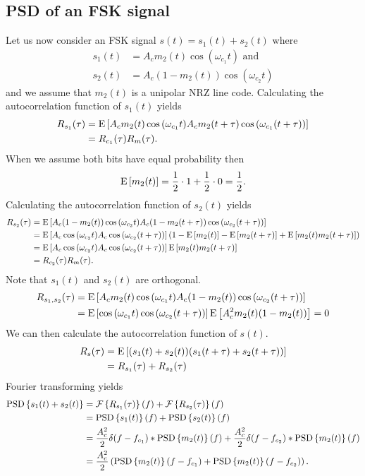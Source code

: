 \documentclass[11pt,titlepage]{report}
\begin{document}
\begin{appendices}
\subsection{PSD of an FSK signal}
Let us now consider an FSK signal $s(t)=s_1(t)+s_2(t)$ where
\begin{align*}
	s_1(t) &= A_c m_2(t) \cos{(\omega_{c_1} t)} \text{ and } \\
	s_2(t) &= A_c (1-m_2(t)) \cos{(\omega_{c_2} t)}
\end{align*}
and we assume that $m_2(t)$ is a unipolar NRZ line code. Calculating the autocorrelation function of $s_1(t)$ yields
\begin{align*}
	R_{s_1}(\tau) &= \operatorname{E}\left[A_c m_2(t) \cos{(\omega_{c_1} t)} A_c m_2(t+\tau) \cos{(\omega_{c_1} (t+\tau))}\right] \\
	&= R_{c_1}(\tau) R_{m}(\tau).
\end{align*}
When we assume both bits have equal probability then
\begin{align*}
	\operatorname{E}\left[m_2(t)\right] = \frac{1}{2} \cdot 1 + \frac{1}{2} \cdot 0 = \frac{1}{2}.
\end{align*}
Calculating the autocorrelation function of $s_2(t)$ yields
\begin{align*}
	R_{s_2}(\tau) &= \operatorname{E}\left[A_c (1-m_2(t)) \cos{(\omega_{c_2} t)} A_c (1-m_2(t+\tau)) \cos{(\omega_{c_2} (t+\tau))}\right] \\
	&= \operatorname{E}\left[A_c\cos{(\omega_{c_2} t)} A_c \cos{(\omega_{c_2} (t+\tau))}\right]\left( 1 - \operatorname{E}\left[m_2(t)\right] - \operatorname{E}\left[m_2(t+\tau)\right] + \operatorname{E}\left[m_2(t)m_2(t+\tau)\right] \right) \\
	&= \operatorname{E}\left[A_c\cos{(\omega_{c_2} t)} A_c \cos{(\omega_{c_2} (t+\tau))}\right] \operatorname{E}\left[m_2(t)m_2(t+\tau)\right] \\
	&= R_{c_2}(\tau) R_{m}(\tau).
\end{align*}
Note that $s_1(t)$ and $s_2(t)$ are orthogonal.
\begin{align*}
	R_{s_1,s_2}(\tau)&=\operatorname{E}\left[A_c m_2(t) \cos{(\omega_{c_1} t)} A_c (1-m_2(t)) \cos{(\omega_{c_2} (t+\tau))}\right] \\
	&= \operatorname{E}\left[\cos{(\omega_{c_1} t)}\cos{(\omega_{c_2} (t+\tau))}\right] \operatorname{E}\left[A_c^2 m_2(t) (1-m_2(t))\right] = 0
\end{align*}
We can then calculate the autocorrelation function of $s(t)$.
\begin{align*}
	R_s(\tau)&=\operatorname{E}\left[(s_1(t)+s_2(t))(s_1(t+\tau)+s_2(t+\tau))\right] \\
	&=R_{s_1}(\tau)+R_{s_2}(\tau)
\end{align*}
Fourier transforming yields
\begin{align}
	\operatorname{PSD}\left\{s_1(t)+s_2(t)\right\} &= \mathcal{F}\left\{R_{s_1}(\tau)\right\}(f) + \mathcal{F}\left\{R_{s_2}(\tau)\right\}(f) \nonumber \\
	&= \operatorname{PSD}\left\{s_1(t)\right\}(f) + \operatorname{PSD}\left\{s_2(t)\right\}(f) \nonumber \\
	&= \frac{A_c^2}{2} \delta(f-f_{c_1}) \ast \operatorname{PSD}\left\{m_2(t)\right\}(f) + \frac{A_c^2}{2} \delta(f-f_{c_2}) \ast \operatorname{PSD}\left\{m_2(t)\right\}(f) \nonumber \\
	&= \frac{A_c^2}{2}\left( \operatorname{PSD}\left\{m_2(t)\right\}(f-f_{c_1}) + \operatorname{PSD}\left\{m_2(t)\right\}(f-f_{c_2}) \right). \label{eq:psd-fsk}
\end{align}

\end{appendices}
\end{document}

